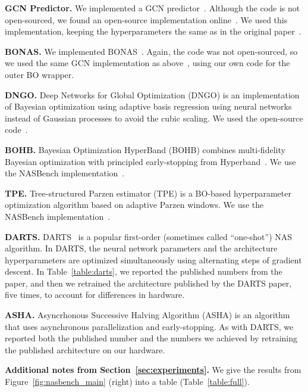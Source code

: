 \documentclass[11pt]{article}
\numberwithin{equation}{section}
\numberwithin{figure}{section}
\theoremstyle{plain}
\theoremstyle{definition}
\begin{document}
\textbf{GCN Predictor.}
We implemented a GCN predictor~\cite{wen2019neural}. Although the code is not open-sourced,
we found an open-source implementation online~\cite{zhang2020neural}.
We used this implementation, keeping the hyperparameters the same as in the original
paper~\cite{wen2019neural}.

\textbf{BONAS.}
We implemented BONAS~\cite{shi2019multi}. Again, the code was not open-sourced,
so we used the same GCN implementation as above~\cite{zhang2020neural},
using our own code for the outer BO wrapper.

\textbf{DNGO.}
Deep Networks for Global Optimization (DNGO) is an implementation of Bayesian optimization
using adaptive basis regression using neural networks instead of
Gaussian processes to avoid the cubic scaling.
We used the open-source code~\cite{snoek2015scalable}.

\textbf{BOHB.}
Bayesian Optimization HyperBand (BOHB) combines multi-fidelity
Bayesian optimization with principled early-stopping from Hyperband~\cite{bohb}.
We use the NASBench implementation~\cite{nasbench}.

\textbf{TPE.}
Tree-structured Parzen estimator (TPE) is a BO-based
hyperparameter optimization algorithm based on
adaptive Parzen windows.
We use the NASBench implementation~\cite{nasbench}.

\textbf{DARTS.}
DARTS~\cite{darts} is a popular first-order (sometimes called ``one-shot'') NAS
algorithm. In DARTS, the neural network parameters and the architecture hyperparameters
are optimized simultaneously using alternating steps of gradient descent.
In Table~\ref{table:darts}, we reported the published numbers from the paper, and
then we retrained the architecture published by the DARTS paper, five times, 
to account for differences in hardware.

\textbf{ASHA.}
Asyncrhonous Successive Halving Algorithm (ASHA) is an algorithm that
uses asynchronous parallelization and early-stopping. 
As with DARTS, we reported both the published number and the numbers we achieved by 
retraining the published architecture on our hardware.

\textbf{Additional notes from Section~\ref{sec:experiments}.}
We give the results from Figure~\ref{fig:nasbench_main} (right) into a table (Table~\ref{table:full}).
\end{document}
